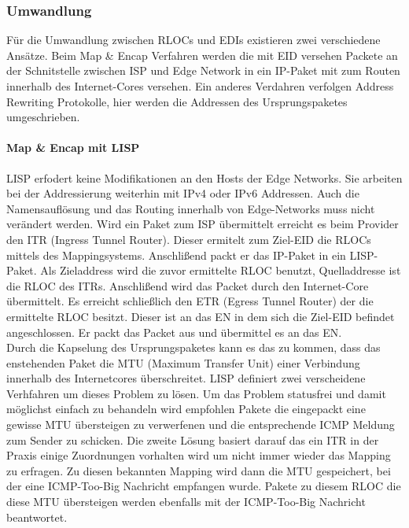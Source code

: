 \subsubsection{Umwandlung}
Für die Umwandlung zwischen RLOCs und EDIs existieren zwei verschiedene Ansätze. Beim Map \& Encap Verfahren werden die mit EID versehen Packete an der Schnitstelle zwischen ISP und Edge Network in ein IP-Paket mit zum Routen innerhalb des Internet-Cores versehen. Ein anderes Verdahren verfolgen Address Rewriting Protokolle, hier werden die Addressen des Ursprungspaketes umgeschrieben. 

\paragraph{Map \& Encap mit LISP}
LISP erfodert keine Modifikationen an den Hosts der Edge Networks. Sie arbeiten bei der Addressierung weiterhin mit IPv4 oder IPv6 Addressen. Auch die Namensauflösung und das Routing innerhalb von Edge-Networks muss nicht verändert werden. Wird ein Paket zum ISP übermittelt erreicht es beim Provider den ITR (Ingress Tunnel Router). Dieser ermitelt zum Ziel-EID die RLOCs mittels des Mappingsystems. Anschlißend packt er das IP-Paket in ein LISP-Paket. Als Zieladdress wird die zuvor ermittelte RLOC benutzt, Quelladdresse ist die RLOC des ITRs. Anschlißend wird das Packet durch den Internet-Core übermittelt. Es erreicht schließlich den ETR (Egress Tunnel Router) der die ermittelte RLOC besitzt. Dieser ist an das EN in dem sich die Ziel-EID befindet angeschlossen. Er packt das Packet aus und übermittel es an das EN. \\
Durch die Kapselung des Ursprungspaketes kann es das zu kommen, dass das enstehenden Paket die MTU (Maximum Transfer Unit) einer Verbindung innerhalb des Internetcores überschreitet. LISP definiert zwei verscheidene Verhfahren um dieses Problem zu lösen. Um das Problem statusfrei und damit möglichst einfach zu behandeln wird empfohlen Pakete die eingepackt eine gewisse MTU übersteigen zu verwerfenen und die entsprechende ICMP Meldung zum Sender zu schicken. Die zweite Lösung basiert darauf das ein ITR in der Praxis einige Zuordnungen vorhalten wird um nicht immer wieder das Mapping zu erfragen. Zu diesen bekannten Mapping wird dann die MTU gespeichert, bei der eine ICMP-Too-Big Nachricht empfangen wurde. Pakete zu diesem RLOC die diese MTU übersteigen werden ebenfalls mit der ICMP-Too-Big Nachricht beantwortet.


